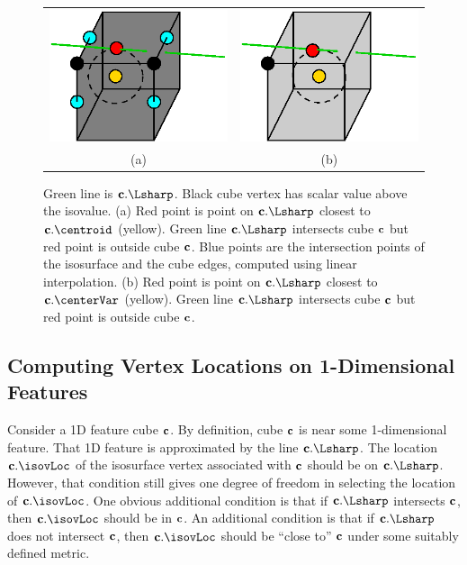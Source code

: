 \begin{figure}[t]
\centering

\begin{tabular}{cc}
\includegraphics[width=0.4\linewidth]{images/centroid.eps} \qquad &
\qquad
\includegraphics[width=0.4\linewidth]{images/center.eps} \\
(a) & (b)
\end{tabular}

\caption{Green line is $\cb.\protect\Lsharp$.
Black cube vertex has scalar value above the isovalue.
(a) Red point is point on $\cb.\protect\Lsharp$ closest 
to $\cb.\protect\centroid$ (yellow).
Green line $\cb.\protect\Lsharp$ intersects cube $\mathbf{c}$
but red point is outside cube $\mathbf{c}$.
Blue points are the intersection points of the isosurface
and the cube edges, computed using linear interpolation.
(b) Red point is point on $\cb.\protect\Lsharp$ closest 
to $\cb.\protect\centerVar$ (yellow).
Green line $\cb.\protect\Lsharp$ intersects cube $\mathbf{c}$
but red point is outside cube $\mathbf{c}$.
}
\label{fig:out_of_cube}
\end{figure}

\subsection{Computing Vertex Locations on 1-Dimensional Features}

Consider a 1D feature cube $\mathbf{c}$.
By definition, cube $\mathbf{c}$ is near some 1-dimensional feature.
That 1D feature is approximated by the line $\cb.\Lsharp$.
The location $\cb.\isovLoc$ of the isosurface vertex associated with $\mathbf{c}$ 
should be on $\cb.\Lsharp$.
However, that condition still gives one degree of freedom in selecting
the location of $\cb.\isovLoc$.
One obvious additional condition is that if $\cb.\Lsharp$ intersects $\mathbf{c}$,
then $\cb.\isovLoc$ should be in $\mathbf{c}$.
An additional condition is that if $\cb.\Lsharp$ does not intersect $\mathbf{c}$,
then $\cb.\isovLoc$ should be ``close to'' $\mathbf{c}$ 
under some suitably defined metric.


